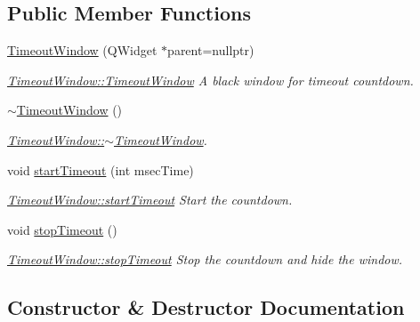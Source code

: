 \subsection*{Public Member Functions}
\begin{DoxyCompactItemize}
\item 
\mbox{\hyperlink{classTimeoutWindow_a5bfb9ad0db51f063b38cbdc38eb5def5}{Timeout\+Window}} (Q\+Widget $\ast$parent=nullptr)
\begin{DoxyCompactList}\small\item\em \mbox{\hyperlink{classTimeoutWindow_a5bfb9ad0db51f063b38cbdc38eb5def5}{Timeout\+Window\+::\+Timeout\+Window}} A black window for timeout countdown. \end{DoxyCompactList}\item 
\mbox{\label{classTimeoutWindow_a59f4f0cb4e9688de1d7892d57a4a63cb}} 
\mbox{\hyperlink{classTimeoutWindow_a59f4f0cb4e9688de1d7892d57a4a63cb}{$\sim$\+Timeout\+Window}} ()
\begin{DoxyCompactList}\small\item\em \mbox{\hyperlink{classTimeoutWindow_a59f4f0cb4e9688de1d7892d57a4a63cb}{Timeout\+Window\+::$\sim$\+Timeout\+Window}}. \end{DoxyCompactList}\item 
void \mbox{\hyperlink{classTimeoutWindow_ae25558362f6afc3c3d04dbea7104efe8}{start\+Timeout}} (int msec\+Time)
\begin{DoxyCompactList}\small\item\em \mbox{\hyperlink{classTimeoutWindow_ae25558362f6afc3c3d04dbea7104efe8}{Timeout\+Window\+::start\+Timeout}} Start the countdown. \end{DoxyCompactList}\item 
\mbox{\label{classTimeoutWindow_a5b768103279ed46da38ebeb2b2a2d549}} 
void \mbox{\hyperlink{classTimeoutWindow_a5b768103279ed46da38ebeb2b2a2d549}{stop\+Timeout}} ()
\begin{DoxyCompactList}\small\item\em \mbox{\hyperlink{classTimeoutWindow_a5b768103279ed46da38ebeb2b2a2d549}{Timeout\+Window\+::stop\+Timeout}} Stop the countdown and hide the window. \end{DoxyCompactList}\end{DoxyCompactItemize}


\subsection{Constructor \& Destructor Documentation}
\mbox{\label{classTimeoutWindow_a5bfb9ad0db51f063b38cbdc38eb5def5}} 
